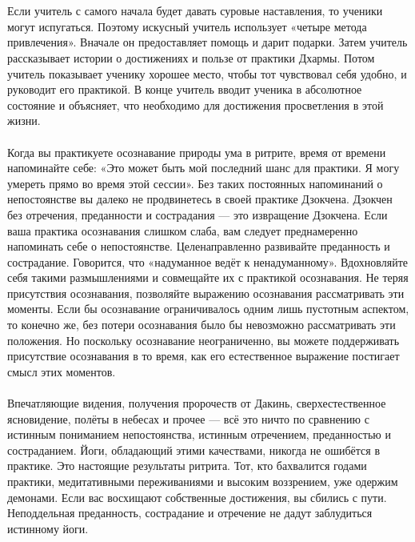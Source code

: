 \\ \\ Если учитель с самого начала будет давать суровые наставления, то ученики могут испугаться. Поэтому искусный учитель использует «четыре метода привлечения». Вначале он предоставляет помощь и дарит подарки. Затем учитель рассказывает истории о достижениях и пользе от практики Дхармы. Потом учитель показывает ученику хорошее место, чтобы тот чувствовал себя удобно, и руководит его практикой. В конце учитель вводит ученика в абсолютное состояние и объясняет, что необходимо для достижения просветления в этой жизни.
\\ \\ Когда вы практикуете осознавание природы ума в ритрите, время от времени напоминайте себе: «Это может быть мой последний шанс для практики. Я могу умереть прямо во время этой сессии». Без таких постоянных напоминаний о непостоянстве вы далеко не продвинетесь в своей практике Дзокчена. Дзокчен без отречения, преданности и сострадания — это извращение Дзокчена. Если ваша практика осознавания слишком слаба, вам следует преднамеренно напоминать себе о непостоянстве. Целенаправленно развивайте преданность и сострадание. Говорится, что «надуманное ведёт к ненадуманному». Вдохновляйте себя такими размышлениями и совмещай\-те их с практикой осознавания. Не теряя присутствия осознавания, позволяйте выражению осознавания рассматривать эти моменты. Если бы осознавание ограничивалось одним лишь пустотным аспектом, то конечно же, без потери осознавания было бы невозможно рассматривать эти положения. Но поскольку осознавание неограниченно, вы можете поддерживать присутствие осознавания в то время, как его естественное выражение постигает смысл этих моментов.
\\ \\ Впечатляющие видения, получения пророчеств от Дакинь, сверхестественное ясновидение, полёты в небесах и прочее — всё это ничто по сравнению с истинным пониманием непостоянства, истинным отречением, преданностью и состраданием. Йоги, обладающий этими качествами, никогда не ошибётся в практике. Это настоящие результаты ритрита. Тот, кто бахвалится годами практики, медитативными переживаниями и высоким воззрением, уже одержим демонами. Если вас восхищают собственные достижения, вы сбились с пути. Неподдельная преданность, сострадание и отречение не дадут заблудиться истинному йоги.
